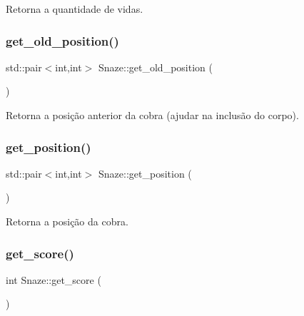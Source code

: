Retorna a quantidade de vidas. 

\mbox{\label{classSnaze_acc7755b314cb101bf9524fca1025a6da}} 
\subsubsection{\texorpdfstring{get\+\_\+old\+\_\+position()}{get\_old\_position()}}
{\footnotesize\ttfamily std\+::pair$<$int,int$>$ Snaze\+::get\+\_\+old\+\_\+position (\begin{DoxyParamCaption}{ }\end{DoxyParamCaption})\hspace{0.3cm}{\ttfamily [inline]}}



Retorna a posição anterior da cobra (ajudar na inclusão do corpo). 

\mbox{\label{classSnaze_a81158f1529cf56aedb109a449fbba85b}} 
\subsubsection{\texorpdfstring{get\+\_\+position()}{get\_position()}}
{\footnotesize\ttfamily std\+::pair$<$int,int$>$ Snaze\+::get\+\_\+position (\begin{DoxyParamCaption}{ }\end{DoxyParamCaption})\hspace{0.3cm}{\ttfamily [inline]}}



Retorna a posição da cobra. 

\mbox{\label{classSnaze_a62bf08554d8952b29c040c4b2c572dab}} 
\subsubsection{\texorpdfstring{get\+\_\+score()}{get\_score()}}
{\footnotesize\ttfamily int Snaze\+::get\+\_\+score (\begin{DoxyParamCaption}{ }\end{DoxyParamCaption})\hspace{0.3cm}{\ttfamily [inline]}}




